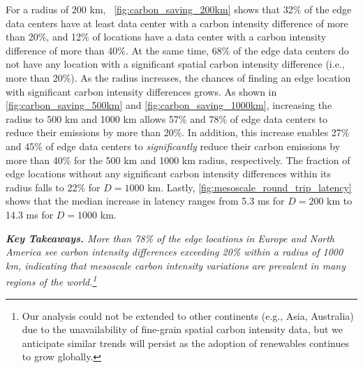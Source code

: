 For a radius of 200 km, ~\autoref{fig:carbon_saving_200km} shows that 32\% of the edge data centers have at least data center with a carbon intensity difference of more than 20\%, and 12\% of locations have a data center with a carbon intensity difference of more than 40\%. At the same time, 68\% of the edge data centers do not have any location with a significant spatial carbon intensity difference (i.e., more than 20\%). As the radius increases, the chances of finding an edge location with significant carbon intensity differences grows.
As shown in \autoref{fig:carbon_saving_500km} and \autoref{fig:carbon_saving_1000km}, increasing the radius to 500 km and 1000 km allows 57\% and 78\% of edge data centers to reduce their emissions by more than 20\%. In addition, this increase enables 27\% and 45\% of edge data centers to {\em significantly} reduce their carbon emissions by more than 40\% for the 500 km and 1000 km radius, respectively. The fraction of edge locations without any significant carbon intensity differences within its radius falls to 22\% for $D=1000$ km. Lastly, \autoref{fig:mesoscale_round_trip_latency} shows that the median increase in latency ranges from 5.3 ms for $D=200$ km to 14.3 ms for $D=1000$ km.

\noindent \textit{\textbf{Key Takeaways.} More than 78\% of the edge locations in Europe and North America see carbon intensity differences exceeding 20\% within a radius of 1000 km, indicating that mesoscale carbon intensity variations are prevalent in many regions of the world.\footnote{Our analysis could not be extended to other continents (e.g., Asia, Australia) due to the unavailability of  fine-grain spatial carbon intensity data, but we anticipate similar trends will persist as the adoption of renewables continues to grow globally.}}





